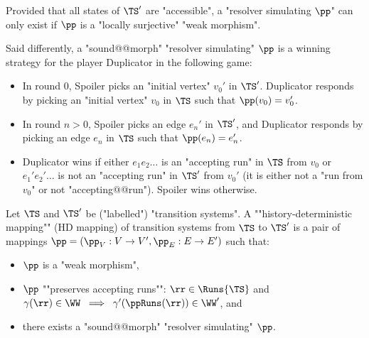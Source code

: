 \documentclass[10pt,a4paper]{amsart}
\renewcommand{\gg}{\gamma}
\begin{document}
\begin{remark}\label{rmk-morph: HD-is-loc.surjective}
	Provided that all states of $\TS'$ are "accessible", a "resolver simulating $\pp$" can only exist if $\pp$ is a "locally surjective" "weak morphism".
\end{remark}



Said differently, a "sound@@morph" "resolver simulating" $\pp$ is a winning strategy for the player Duplicator in the following game:
\begin{itemize}
	\item In round $0$, Spoiler picks an "initial vertex" $v_0'$ in $\TS'$. Duplicator responds by picking an "initial vertex" $v_0$ in $\TS$ such that $\pp(v_0) = v_0'$.
	\item In round $n>0$, Spoiler picks an edge $e_n'$ in $\TS'$, and Duplicator responds by picking an edge $e_n$ in $\TS$ such that $\pp(e_n) = e_n'$.
	\item Duplicator wins if either $e_1e_2\dots$ is an "accepting run" in $\TS$ from $v_0$ or $e_1'e_2'\dots$ is not an "accepting run" in $\TS'$ from $v_0'$ (it is either not a "run from $v_0$" or not "accepting@@run"). Spoiler wins otherwise.
\end{itemize}


\begin{definition}\label{def:HD_mapping}
	Let $\TS$ and $\TS'$ be ("labelled") "transition systems".
	\AP A ""history-deterministic mapping"" (HD mapping) of transition systems from $\TS$ to $\TS'$ is a pair of mappings $\pp = (\pp_V: V \rightarrow V', \pp_E: E \rightarrow E')$ such that:
	\begin{itemize}
		\item $\pp$ is a "weak morphism",
		\item $\pp$ ""preserves accepting runs"":  $\rr \in \Runs{\TS}$ and  $\gg(\rr) \in \WW \; \implies \; \gg'(\ppRuns(\rr)) \in \WW'$, and%
		\item there exists a "sound@@morph" "resolver simulating" $\pp$. 
	\end{itemize}
\end{definition}
\end{document}
